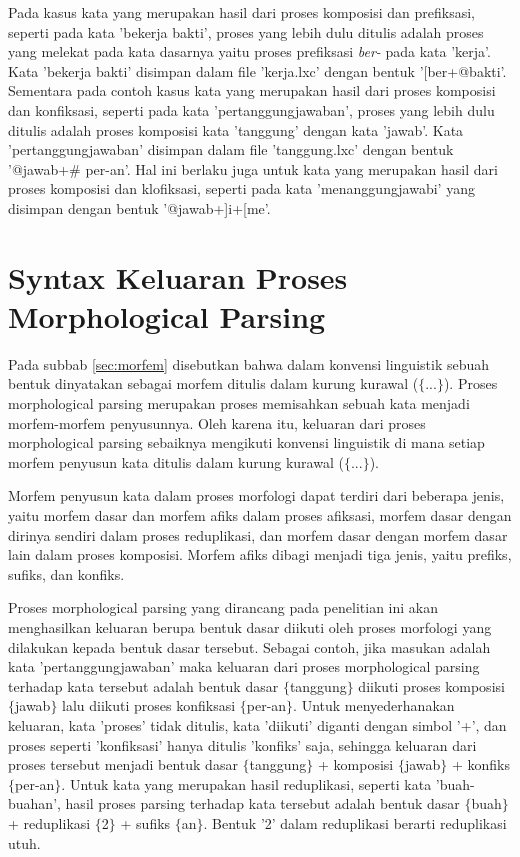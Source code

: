 Pada kasus kata yang merupakan hasil dari proses komposisi dan prefiksasi, seperti pada kata 'bekerja bakti', proses yang lebih dulu ditulis adalah proses yang melekat pada kata dasarnya yaitu proses prefiksasi \textit{ber-} pada kata 'kerja'. Kata 'bekerja bakti' disimpan dalam file 'kerja.lxc' dengan bentuk '[ber+@bakti'. Sementara pada contoh kasus kata yang merupakan hasil dari proses komposisi dan konfiksasi, seperti pada kata 'pertanggungjawaban', proses yang lebih dulu ditulis adalah proses komposisi kata 'tanggung' dengan kata 'jawab'. Kata 'pertanggungjawaban' disimpan dalam file 'tanggung.lxc' dengan bentuk '@jawab+\# per-an'. Hal ini berlaku juga untuk kata yang merupakan hasil dari proses komposisi dan klofiksasi, seperti pada kata 'menanggungjawabi' yang disimpan dengan bentuk '@jawab+]i+[me'.


\section{Syntax Keluaran Proses Morphological Parsing}
\label{sec:syntaxKeluaran}

Pada subbab \ref{sec:morfem} disebutkan bahwa dalam konvensi linguistik sebuah bentuk dinyatakan sebagai morfem ditulis dalam kurung kurawal ($\lbrace$...$\rbrace$). Proses morphological parsing merupakan proses memisahkan sebuah kata menjadi morfem-morfem penyusunnya. Oleh karena itu, keluaran dari proses morphological parsing sebaiknya mengikuti konvensi linguistik di mana setiap morfem penyusun kata ditulis dalam kurung kurawal ($\lbrace$...$\rbrace$).

Morfem penyusun kata dalam proses morfologi dapat terdiri dari beberapa jenis, yaitu morfem dasar dan morfem afiks dalam proses afiksasi, morfem dasar dengan dirinya sendiri dalam proses reduplikasi, dan morfem dasar dengan morfem dasar lain dalam proses komposisi. Morfem afiks dibagi menjadi tiga jenis, yaitu prefiks, sufiks, dan konfiks. 

Proses morphological parsing yang dirancang pada penelitian ini akan menghasilkan keluaran berupa bentuk dasar diikuti oleh proses morfologi yang dilakukan kepada bentuk dasar tersebut. Sebagai contoh, jika masukan adalah kata 'pertanggungjawaban' maka keluaran dari proses morphological parsing terhadap kata tersebut adalah bentuk dasar $\lbrace$tanggung$\rbrace$ diikuti proses komposisi $\lbrace$jawab$\rbrace$ lalu diikuti proses konfiksasi $\lbrace$per-an$\rbrace$. Untuk menyederhanakan keluaran, kata 'proses' tidak ditulis, kata 'diikuti' diganti dengan simbol '+', dan proses seperti 'konfiksasi' hanya ditulis 'konfiks' saja, sehingga keluaran dari proses tersebut menjadi bentuk dasar $\lbrace$tanggung$\rbrace$ + komposisi $\lbrace$jawab$\rbrace$ + konfiks $\lbrace$per-an$\rbrace$. Untuk kata yang merupakan hasil reduplikasi, seperti kata 'buah-buahan', hasil proses parsing terhadap kata tersebut adalah bentuk dasar $\lbrace$buah$\rbrace$ + reduplikasi $\lbrace$2$\rbrace$ + sufiks $\lbrace$an$\rbrace$. Bentuk '2' dalam reduplikasi berarti reduplikasi utuh.

